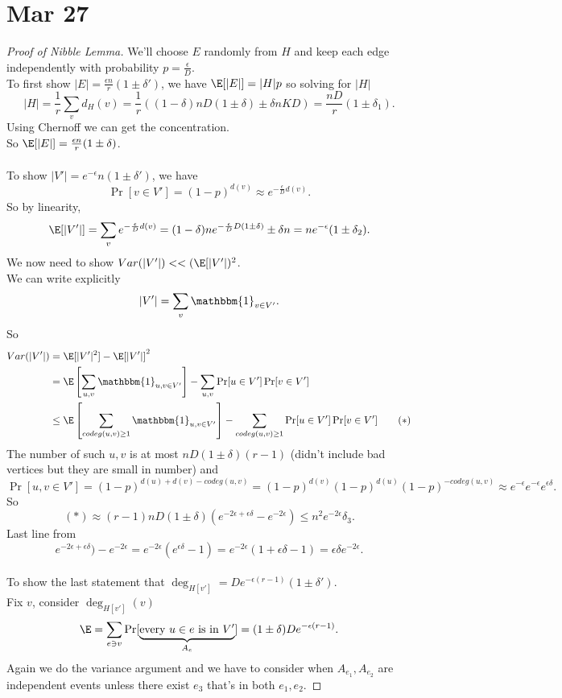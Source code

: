 \documentclass[a4paper]{article}
\begin{document}
\section{Mar 27}
\begin{proof}[Proof of Nibble Lemma]
    We'll choose $E$ randomly from $H$ and keep each edge independently with probability $p=\frac{\epsilon}{D}$. \\
    To first show $|E|=\frac{\epsilon n}{r}(1\pm \delta')$, we have $\E[|E|]=|H|p$ so solving for $|H|$
    \[
    |H|= \frac{1}{r}\sum_v d_H(v) = \frac{1}{r}((1-\delta)n D(1\pm \delta)\pm \delta n KD)= \frac{nD}{r}(1\pm \delta_1)
    .\] 
    Using Chernoff we can get the concentration.\\
    So $\E[|E|]= \frac{\epsilon n}{r}(1\pm \delta)$. \\\\
    To show $|V'|=e^{-\epsilon}n(1\pm \delta')$, we have 
    \[
        \Pr[v\in V']=(1-p)^{d(v)}\approx e^{-\frac{\epsilon}{D}d(v)}
    .\] 
    So by linearity,
    \[
    \E[|V'|]=\sum_v e^{-\frac{\epsilon}{D}d(v)}=(1-\delta)ne^{-\frac{\epsilon}{D}D(1\pm \delta)}\pm \delta n =ne^{-\epsilon}(1\pm \delta_2)
    .\] 
    We now need to show $Var(|V'|)<<(\E[|V'|)^2$. \\
    We can write explicitly 
    \[
    |V'|=\sum_v \mathbbm{1}_{v\in V'}
    .\] 
    So 
    \begin{align*}
        Var(|V'|)&=\E[|V'|^2]-\E[|V'|]^2\\
        &= \E \left[ \sum_{u,v}\mathbbm{1}_{u,v\in V'} \right]-\sum_{u,v}\Pr[u\in V']\Pr[v\in V']\\
        &\leq \E \left [\sum_{codeg(u,v)\geq 1} \mathbbm{1}_{u,v\in V'} \right ]-\sum_{codeg(u,v)\geq 1}\Pr[u\in V']\Pr[v\in V'] \tag{$*$}
    \end{align*}
    The number of such $u,v$ is at most $nD(1\pm \delta)(r-1)$ (didn't include bad vertices but they are small in number) and 
    \[
    \Pr[u,v\in V']=(1-p)^{d(u)+d(v)-codeg(u,v)}=(1-p)^{d(v)}(1-p)^{d(u)}(1-p)^{-codeg(u,v)}\approx e^{-\epsilon}e^{-\epsilon}e^{\epsilon \delta}
    .\]  
    So 
    \[
    (*)\approx (r-1)nD(1\pm \delta) \left (e^{-2\epsilon+\epsilon \delta}-e^{-2\epsilon}\right )\leq n^2 e^{-2\epsilon}\delta_3
    .\] 
    Last line from 
    \[
    e^{-2\epsilon+\epsilon \delta})-e^{-2\epsilon}=e^{-2\epsilon}(e^{\epsilon \delta}-1)=e^{-2\epsilon}(1+\epsilon \delta-1)=\epsilon \delta e^{-2\epsilon}
    .\] \\
    To show the last statement that $\deg_{H[v']}=De^{-\epsilon(r-1)}(1\pm \delta')$. \\
    Fix $v$, consider $\deg_{H[v']}(v)$ 
    \[
    \E = \sum_{e\ni v} \Pr[ \underbrace{\text{every }u\in e \text{ is in } V'}_{A_e}]=(1\pm \delta)De^{-\epsilon(r-1)}
    .\] 
    Again we do the variance argument and we have to consider when $A_{e_1},A_{e_2}$ are independent events unless there exist $e_3$ that's in both $e_1,e_2$. 
\end{proof}
\newpage
\end{document}
